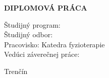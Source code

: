 \begin{titlepage}
\begin{center}
        {\fontsize{14}{16}\bfseries \univerzita}
        
        \vspace{0.8cm}
        
        {\fontsize{13}{15}\bfseries \fakulta}
        
        \vspace{5cm}
        
        {\fontsize{14}{16}\bfseries \MakeUppercase{\nazovprace}}
        
        \vspace{0.8cm}
        
        {\fontsize{14}{16}\bfseries DIPLOMOVÁ PRÁCA}
        
        \vfill
        
        \begin{minipage}[b]{1.0\textwidth}
            \raggedright
            Študijný program: \studijnyprogram \\
            Študijný odbor: \studijnyodbor \\
            Pracovisko: Katedra fyzioterapie \\
            Vedúci záverečnej práce: \veduci
        \end{minipage}
        
        \vspace{1.5cm}
        
        \begin{minipage}[b]{0.4\textwidth}
            \raggedright
            Trenčín \rok
        \end{minipage}%
        \hfill
        \begin{minipage}[b]{0.4\textwidth}
            \raggedleft
            \autor
        \end{minipage}
        
    \end{center}

\end{titlepage}

